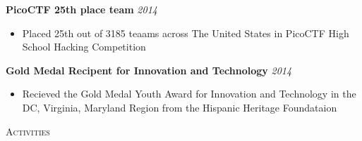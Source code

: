 \documentclass[9pt]{article}
\newenvironment{changemargin}[2]{%
  \begin{list}{}{%
    \setlength{\topsep}{0pt}%
    \setlength{\leftmargin}{#1}%
    \setlength{\rightmargin}{#2}%
    \setlength{\listparindent}{\parindent}%
    \setlength{\itemindent}{\parindent}%
    \setlength{\parsep}{\parskip}%
  }%
  \item[]}{\end{list}
}
\newcommand{\lineover}{
	\begin{changemargin}{-0.05in}{-0.05in}
		\vspace*{-8pt}
		\hrulefill \\
		\vspace*{-2pt}
	\end{changemargin}
}
\newcommand{\header}[1]{
	\begin{changemargin}{-0.5in}{-0.5in}
		\scshape{#1}\\
  	\lineover
	\end{changemargin}
}
\newenvironment{body} {
	\vspace*{-10pt}
	\begin{changemargin}{-0.25in}{-0.5in}
  }	
	{\end{changemargin}
}
\begin{document}
\begin{body}
	\vspace{14pt}
  \textbf{PicoCTF 25th place team} \hfill{} \emph{2014}\\
	\vspace{-4pt}
	\begin{itemize} \itemsep -0pt
		\item[]  Placed 25th out of 3185 teaams across The United States in PicoCTF High School Hacking Competition
	\end{itemize}
	\smallskip
	
	\textbf{Gold Medal Recipent for Innovation and Technology} \hfill{} \emph{2014}\\
	\vspace{-4pt}
	\begin{itemize} \itemsep -0pt
		\item[]  Recieved the Gold Medal Youth Award for Innovation and Technology in the DC, Virginia, Maryland Region from the Hispanic Heritage Foundataion
	\end{itemize}
	\smallskip

\end{body}
\header{Activities}
\end{document}
